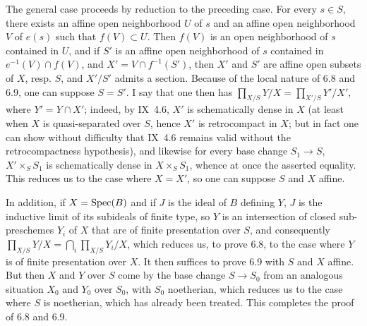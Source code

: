 The general case proceeds by reduction to the preceding case. For every $s\in S$, there exists an affine open neighborhood $U$ of $s$ and an affine open neighborhood $V$ of $e(s)$ such that $f(V)\subset U$. Then $f(V)$ is an open neighborhood of $s$ contained in $U$, and if $S'$ is an affine open neighborhood of $s$ contained in $e^{-1}(V)\cap f(V)$, and $X'=V\cap f^{-1}(S')$, then $X'$ and $S'$ are affine open subsets of $X$, resp. $S$, and $X'/S'$ admits a section. Because of the local nature of 6.8 and 6.9, one can suppose $S=S'$. I say that one then has $\prod_{X/S}Y/X=\prod_{X'/S}Y'/X'$, where $Y'=Y\cap X'$; indeed, by IX~4.6, $X'$ is schematically dense in $X$ (at least when $X$ is quasi-separated over $S$, hence $X'$ is retrocompact in $X$; but in fact one can show without difficulty that IX~4.6 remains valid without the retrocompactness hypothesis), and likewise for every base change $S_1\to S$, $X'\times_S S_1$ is schematically dense in $X\times_S S_1$, whence at once the asserted equality. This reduces us to the case where $X=X'$, so one can suppose $S$ and $X$ affine.

In addition, if $X=\operatorname{Spec}(B)$ and if $J$ is the ideal of $B$ defining $Y$, $J$ is the inductive limit of its subideals of finite type, so $Y$ is an intersection of closed sub-preschemes $Y_i$ of $X$ that are of finite presentation over $S$, and consequently $\prod_{X/S}Y/X=\bigcap_i\prod_{X/S}Y_i/X$, which reduces us, to prove 6.8, to the case where $Y$ is of finite presentation over $X$. It then suffices to prove 6.9 with $S$ and $X$ affine. But then $X$ and $Y$ over $S$ come by the base change $S\to S_0$ from an analogous situation $X_0$ and $Y_0$ over $S_0$, with $S_0$ noetherian, which reduces us to the case where $S$ is noetherian, which has already been treated. This completes the proof of 6.8 and 6.9.

